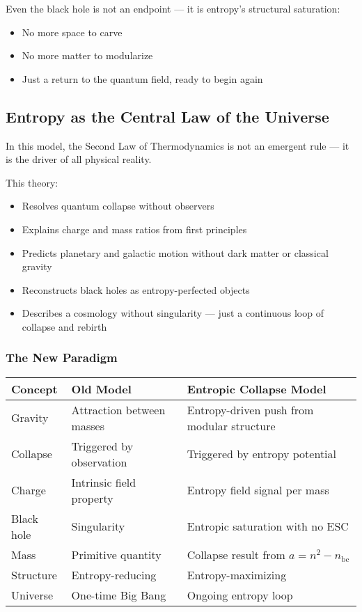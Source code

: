 \documentclass[12pt]{article}
\begin{document}
Even the black hole is not an endpoint — it is entropy’s structural saturation:
\begin{itemize}
    \item No more space to carve
    \item No more matter to modularize
    \item Just a return to the quantum field, ready to begin again
\end{itemize}

\subsection{Entropy as the Central Law of the Universe}

In this model, the Second Law of Thermodynamics is not an emergent rule — it is the driver of all physical reality.

This theory:
\begin{itemize}
    \item Resolves quantum collapse without observers
    \item Explains charge and mass ratios from first principles
    \item Predicts planetary and galactic motion without dark matter or classical gravity
    \item Reconstructs black holes as entropy-perfected objects
    \item Describes a cosmology without singularity — just a continuous loop of collapse and rebirth
\end{itemize}

\subsubsection*{\textbf{The New Paradigm}}

\vspace{0.5em}
\begin{center}
\begin{tabular}{|p{3.2cm}|p{5.4cm}|p{5.4cm}|}
\hline
\textbf{Concept} & \textbf{Old Model} & \textbf{Entropic Collapse Model} \\
\hline
Gravity & Attraction between masses & Entropy-driven push from modular structure \\
\hline
Collapse & Triggered by observation & Triggered by entropy potential \\
\hline
Charge & Intrinsic field property & Entropy field signal per mass \\
\hline
Black hole & Singularity & Entropic saturation with no ESC \\
\hline
Mass & Primitive quantity & Collapse result from $a = n^2 - n_{\text{bc}}$ \\
\hline
Structure & Entropy-reducing & Entropy-maximizing \\
\hline
Universe & One-time Big Bang & Ongoing entropy loop \\
\hline
\end{tabular}
\end{center}
\vspace{0.5em}
\end{document}

